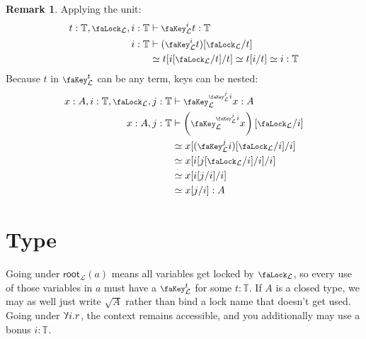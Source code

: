 \documentclass[10pt]{article}
\theoremstyle{definition}
\newtheorem{remark}[theorem]{Remark}
\let\oldequiv\equiv%
\renewcommand{\equiv}{\simeq}
\newcommand{\defeq}{\oldequiv}
\newcommand{\rulen}[1]{\textsc{#1}}
\newcommand{\yields}{\vdash}
\newcommand*{\univ}{\mathcal{U}}
\newcommand{\lock}{\mathchoice
{\scalebox{0.8}{\text{\faLock}}}
{\scalebox{0.8}{\text{\faLock}}}
{\scalebox{0.5}{\text{\faLock}}}
{\scalebox{0.4}{\text{\faLock}}}
}
\newcommand{\key}{\mathchoice
{\scalebox{0.8}{\text{\faKey}}}
{\scalebox{0.8}{\text{\faKey}}}
{\scalebox{0.5}{\text{\faKey}}}
{\scalebox{0.4}{\text{\faKey}}}
}
\newcommand{\Tiny}{\mathbb{T}}
\newcommand{\lockn}[1]{\mathcal{#1}}
\newcommand{\varkey}[2]{\key_{\lockn{#1}}^{#2}}
\newcommand{\admkey}[2]{\overrightarrow{\key}_{\lockn{#1}}^{#2}}
\newcommand{\ctxlock}[1]{\lock_{\lockn{#1}}}
\newcommand{\locksub}[2]{\lock_{\lockn{#1}}/#2}
\newcommand{\rform}[2]{\surd_{\lockn{#1}} #2}
\newcommand{\rformu}[1]{\surd #1}
\newcommand{\rintro}[2]{\mathsf{root}_{\lockn{#1}}(#2)}
\newcommand{\rbindsym}{\scalerel*{\reflectbox{\rotatebox[origin=c]{180}{$\lambda$}}}{\lambda}}
\newcommand{\relim}[1]{\rbindsym #1}
\begin{document}
\begin{remark}
Applying the unit:
\begin{align*}
t : \Tiny,\ctxlock{L}, i : \Tiny &\yields \varkey{L}{i} t : \Tiny \\
i : \Tiny &\yields (\varkey{L}{i} t)[\locksub{L}{t}] \\
&\defeq t[i[\locksub{L}{t}]/t] \defeq t[i/t] \defeq i : \Tiny
\end{align*}
Because $t$ in $\varkey{L}{t}$ can be any term, keys can be nested:
\begin{align*}
x : A, i : \Tiny, \ctxlock{L}, j : \Tiny &\yields \varkey{L}{\varkey{L}{j}i} x : A \\
x : A, j : \Tiny &\yields \left( \varkey{L}{\varkey{L}{j}i} x\right)[\locksub{L}{i}] \\
&\defeq x[(\varkey{L}{j}i)[\locksub{L}{i}]/i] \\
&\defeq x[i[j[\locksub{L}{i}]/i]/i] \\
&\defeq x[i[j/i]/i] \\
&\defeq x[j/i] : A
\end{align*}
\end{remark}

\section{Type}

Going under $\rintro{L} a$ means all variables get locked by $\ctxlock{L}$, so every use of those variables in $a$ must have a $\varkey{L}{t}$ for some $t : \Tiny$. If $A$ is a closed type, we may as well just write $\rformu A$ rather than bind a lock name that doesn't get used. Going under $\relim{i.r}$, the context remains accessible, and you additionally may use a bonus $i : \Tiny$.

\end{document}
